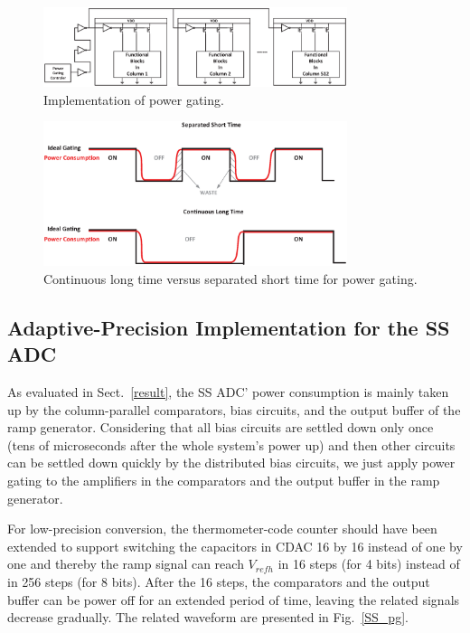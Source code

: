 \begin{figure}[htbp]
	\centerline{\includegraphics[width=3.5in]{./Figures/GATING.eps}}
	\caption{Implementation of power gating.}
	\label{GATING}
\end{figure} 

\begin{figure}[htbp]
	\centerline{\includegraphics[width=3.5in]{./Figures/TIME.eps}}
	\caption{Continuous long time versus separated short time for power gating.}
	\label{TIME}
\end{figure}  

\subsection{Adaptive-Precision Implementation for the SS ADC}\label{gating2}

As evaluated in Sect.~\ref{result}, the SS ADC’ power consumption is mainly taken up by the column-parallel comparators, bias circuits, and the output buffer of the ramp generator. 
Considering that all bias circuits are settled down only once (tens of microseconds after the whole system's power up) and then other circuits can be settled down quickly by the distributed 
bias circuits, we just apply power gating to the amplifiers in the comparators and the output buffer in the ramp generator.

For low-precision conversion, the thermometer-code counter should have been extended to support switching the capacitors in CDAC 16 by 16 instead of one by one and thereby the ramp signal can reach $V_{refh}$ in 16 steps (for 4 bits) instead of in 256 steps (for 8 bits). 
After the 16 steps, the comparators and the output buffer can be power off for an extended period of time, leaving the related signals decrease gradually.
The related waveform are presented in Fig.~\ref{SS_pg}. 

